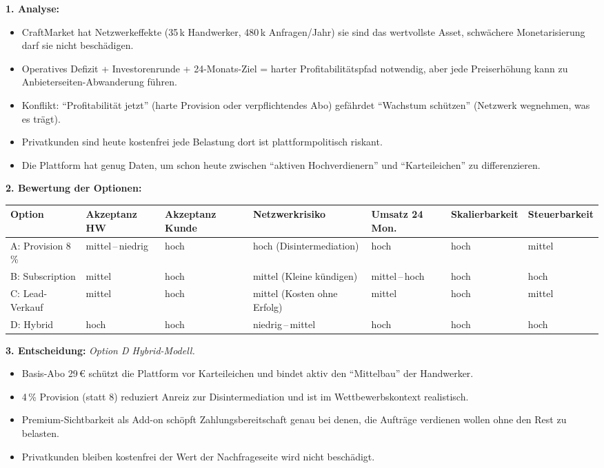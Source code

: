 \documentclass[11pt,a4paper,oneside]{article}
\begin{document}
\begin{loesungbox}
\textbf{1. Analyse:}
\begin{itemize}
  \item CraftMarket hat Netzwerkeffekte (35\,k Handwerker, 480\,k Anfragen/Jahr) \textendash{} sie sind das wertvollste Asset, schwächere Monetarisierung darf sie nicht beschädigen.
  \item Operatives Defizit + Investorenrunde + 24-Monats-Ziel = harter Profitabilitätspfad notwendig, aber jede Preiserhöhung kann zu Anbieterseiten-Abwanderung führen.
  \item Konflikt: ``Profitabilität jetzt'' (harte Provision oder verpflichtendes Abo) gefährdet ``Wachstum schützen'' (Netzwerk wegnehmen, was es trägt).
  \item Privatkunden sind heute kostenfrei \textendash{} jede Belastung dort ist plattformpolitisch riskant.
  \item Die Plattform hat genug Daten, um schon heute zwischen ``aktiven Hochverdienern'' und ``Karteileichen'' zu differenzieren.
\end{itemize}

\smallskip
\textbf{2. Bewertung der Optionen:}

\smallskip
\begin{tabularx}{\linewidth}{@{}lXXXXXX@{}}
\toprule
\textbf{Option} & \textbf{Akzeptanz HW} & \textbf{Akzeptanz Kunde} & \textbf{Netzwerkrisiko} & \textbf{Umsatz 24 Mon.} & \textbf{Skalierbarkeit} & \textbf{Steuerbarkeit} \\
\midrule
A: Provision 8\,\% & mittel\,--\,niedrig & hoch & hoch (Disintermediation) & hoch & hoch & mittel \\
B: Subscription & mittel & hoch & mittel (Kleine kündigen) & mittel\,--\,hoch & hoch & hoch \\
C: Lead-Verkauf & mittel & hoch & mittel (Kosten ohne Erfolg) & mittel & hoch & mittel \\
D: Hybrid & hoch & hoch & niedrig\,--\,mittel & hoch & hoch & hoch \\
\bottomrule
\end{tabularx}

\smallskip
\textbf{3. Entscheidung:}
\emph{Option D \textendash{} Hybrid-Modell.}
\begin{itemize}
  \item Basis-Abo 29\,\euro{} schützt die Plattform vor Karteileichen und bindet aktiv den ``Mittelbau'' der Handwerker.
  \item 4\,\% Provision (statt 8) reduziert Anreiz zur Disintermediation und ist im Wettbewerbskontext realistisch.
  \item Premium-Sichtbarkeit als Add-on schöpft Zahlungsbereitschaft genau bei denen, die Aufträge verdienen wollen \textendash{} ohne den Rest zu belasten.
  \item Privatkunden bleiben kostenfrei \textendash{} der Wert der Nachfrageseite wird nicht beschädigt.
\end{itemize}


\end{loesungbox}
\end{document}
